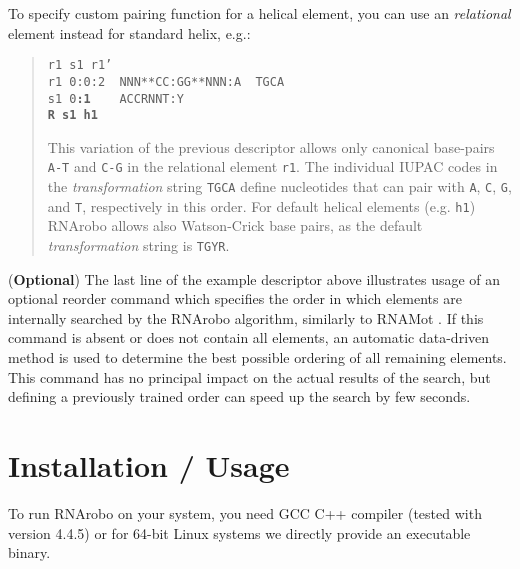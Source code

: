 \documentclass[11pt]{article}
\begin{document}
To specify custom pairing function for a helical element, you can use an \emph{relational} element instead for standard helix, e.g.:
\begin{quote}
\texttt{r1 s1 r1'}\\
\texttt{r1 0:0:2 ~NNN**CC:GG**NNN:A ~TGCA}\\
\texttt{s1 0\textbf{:1} ~~~ACCRNNT:Y} \\
\texttt{\textbf{R s1 h1}}

This variation of the previous descriptor allows only canonical base-pairs \texttt{A-T} and \texttt{C-G} in the relational element \texttt{r1}. The individual IUPAC codes in the \emph{transformation} string \texttt{TGCA} define nucleotides that can pair with \texttt{A}, \texttt{C}, \texttt{G}, and \texttt{T}, respectively in this order. For default helical elements (e.g. \texttt{h1}) RNArobo allows also Watson-Crick base pairs, as the default \emph{transformation} string is \texttt{TGYR}.
\end{quote}

(\textbf{Optional}) The last line of the example descriptor above illustrates usage of an optional reorder command which specifies the order in which elements are internally searched by the RNArobo algorithm, similarly to RNAMot \citep{gautheret1990}. If this command is absent or does not contain all elements, an automatic data-driven method is used to determine the best possible ordering of all remaining elements. This command has no principal impact on the actual results of the search, but defining a previously trained order can speed up the search by few seconds.

\section*{Installation / Usage}
To run RNArobo on your system, you need GCC C++ compiler (tested with version 4.4.5) or for 64-bit Linux systems we directly provide an executable binary.
\end{document}
